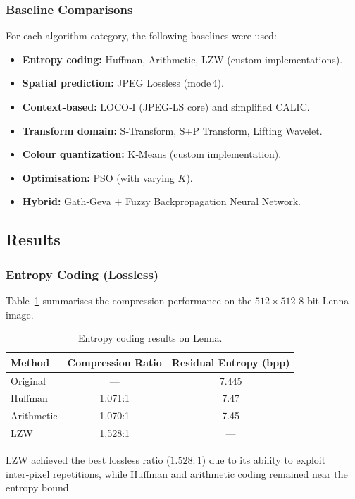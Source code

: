 \subsubsection{Baseline Comparisons}
For each algorithm category, the following baselines were used:
\begin{itemize}
    \item \textbf{Entropy coding:} Huffman, Arithmetic, LZW (custom implementations).
    \item \textbf{Spatial prediction:} JPEG Lossless (mode 4).
    \item \textbf{Context‑based:} LOCO‑I (JPEG‑LS core) and simplified CALIC.
    \item \textbf{Transform domain:} S‑Transform, S+P Transform, Lifting Wavelet.
    \item \textbf{Colour quantization:} K‑Means (custom implementation).
    \item \textbf{Optimisation:} PSO (with varying $K$).
    \item \textbf{Hybrid:} Gath‑Geva + Fuzzy Backpropagation Neural Network.
\end{itemize}

\subsection{Results}

\subsubsection{Entropy Coding (Lossless)}
Table~\ref{tab:entropy_results} summarises the compression performance on the $512\times512$ 8‑bit Lenna image.

\begin{table}[H]
\centering
\caption{Entropy coding results on Lenna.}
\label{tab:entropy_results}
\begin{tabular}{l c c}
\hline
\textbf{Method} & \textbf{Compression Ratio} & \textbf{Residual Entropy (bpp)} \\
\hline
Original & — & 7.445 \\
Huffman & 1.071:1 & 7.47 \\
Arithmetic & 1.070:1 & 7.45 \\
LZW & 1.528:1 & — \\
\hline
\end{tabular}
\end{table}

LZW achieved the best lossless ratio ($1.528:1$) due to its ability to exploit inter‑pixel repetitions, while Huffman and arithmetic coding remained near the entropy bound.

